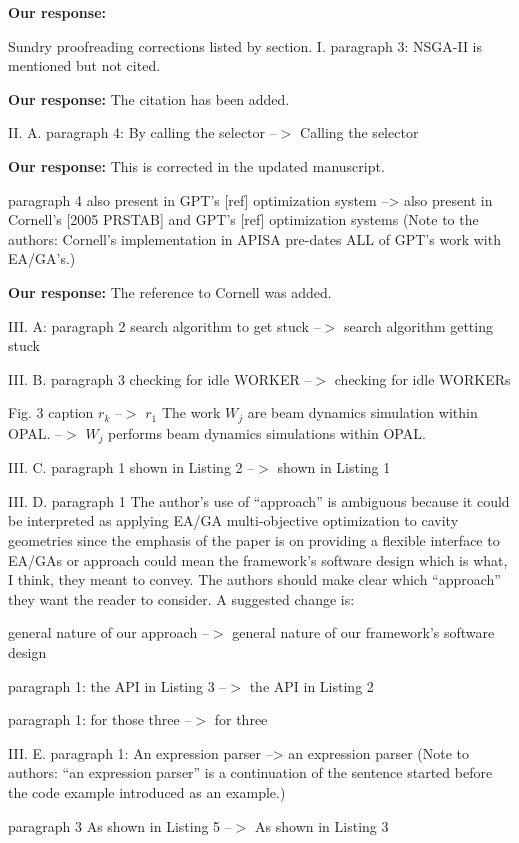 \documentclass{article}
\begin{document}
{\bf Our response:} {\color{blue} }

Sundry proofreading corrections listed by section.
I. paragraph 3: NSGA-II is mentioned but not cited.

{\bf Our response:} {\color{blue} The citation has been added.}

II. A. paragraph 4: By calling the selector --$>$ Calling the selector

{\bf Our response:} {\color{blue} This is corrected in the updated manuscript.}

paragraph 4
also present in GPT's [ref] optimization system --> also
present in Cornell's [2005 PRSTAB] and GPT's [ref] optimization systems
(Note to the authors: Cornell's implementation in APISA pre-dates ALL
of GPT's work with EA/GA's.)

{\bf Our response:} {\color{blue} The reference to Cornell was added.}

III. A: paragraph 2
search algorithm to get stuck --$>$ search algorithm getting
stuck

III. B. paragraph 3
checking for idle WORKER --$>$ checking for idle WORKERs

Fig. 3 caption
$r_k$ --$>$ $r_1$
The work $W_j$ are beam dynamics simulation within OPAL.
--$>$ $W_j$ performs beam dynamics simulations within OPAL.

III. C. paragraph 1
shown in Listing 2 --$>$ shown in Listing 1

III. D. paragraph 1
The author's use of ``approach'' is ambiguous because it could be
interpreted as applying EA/GA multi-objective optimization to cavity
geometries since the emphasis of the paper is on providing a flexible
interface to EA/GAs or approach could mean the framework's software
design which is what, I think, they meant to convey. The authors
should make clear which ``approach'' they want the reader to consider.
A suggested change is:

general nature of our approach --$>$ general nature of our
framework's software design

paragraph 1: the API in Listing 3 --$>$ the API in Listing 2

paragraph 1: for those three --$>$ for three

III. E. paragraph 1:
An expression parser --> an expression parser
(Note to authors: ``an expression parser'' is a continuation of the
sentence started before the code example introduced as an example.)

paragraph 3
As shown in Listing 5 --$>$ As shown in Listing 3
\end{document}

